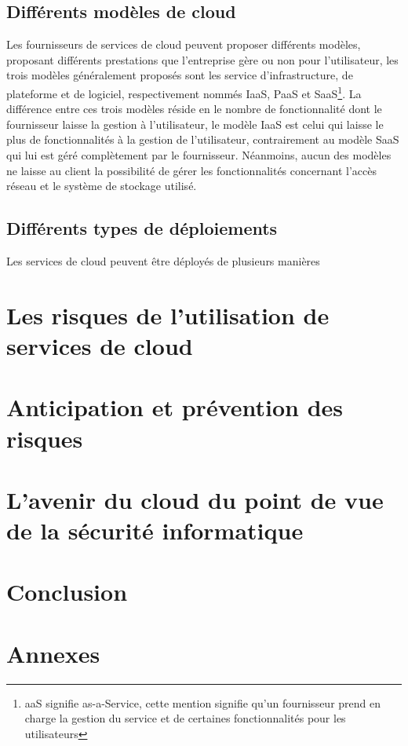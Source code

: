 \documentclass[a4paper, 12pt]{article}
\begin{document}
    \subsection{Différents modèles de cloud}
      Les fournisseurs de services de cloud peuvent proposer différents modèles,
      proposant différents prestations que l'entreprise gère ou non pour
      l'utilisateur, les trois modèles généralement proposés sont les service
      d'infrastructure, de plateforme et de logiciel, respectivement nommés
      IaaS, PaaS et SaaS\footnote{aaS signifie as-a-Service, cette mention
      signifie qu'un fournisseur prend en charge la gestion du service et de
      certaines fonctionnalités pour les utilisateurs}. La différence entre ces
      trois modèles réside en le nombre de fonctionnalité dont le fournisseur
      laisse la gestion à l'utilisateur, le modèle IaaS est celui qui laisse le
      plus de fonctionnalités à la gestion de l'utilisateur, contrairement au
      modèle SaaS qui lui est géré complètement par le fournisseur. Néanmoins,
      aucun des modèles ne laisse au client la possibilité de gérer les
      fonctionnalités concernant l'accès réseau et le système de stockage
      utilisé.

    \subsection{Différents types de déploiements}
      Les services de cloud peuvent être déployés de plusieurs manières

  \section{Les risques de l'utilisation de services de cloud}

  \section{Anticipation et prévention des risques}

  \section{L'avenir du cloud du point de vue de la sécurité informatique}

  \section{Conclusion}

  \section{Annexes}
    \begin{figure}

    \end{figure}
\end{document}
